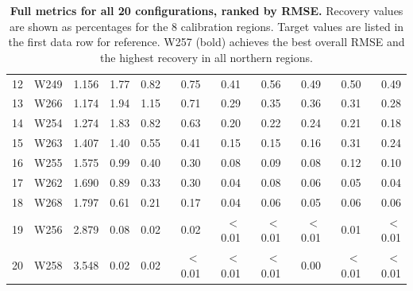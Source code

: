 \documentclass[11pt,a4paper,oneside]{article}
\begin{document}
\begin{table}[H]
\begin{tabular}{ll r rrrrrrrr}
12 & W249 & 1.156 & 1.77 & 0.82 & 0.75 & 0.41 & 0.56 & 0.49 & 0.50 & 0.49 \\
13 & W266 & 1.174 & 1.94 & 1.15 & 0.71 & 0.29 & 0.35 & 0.36 & 0.31 & 0.28 \\
14 & W254 & 1.274 & 1.83 & 0.82 & 0.63 & 0.20 & 0.22 & 0.24 & 0.21 & 0.18 \\
15 & W263 & 1.407 & 1.40 & 0.55 & 0.41 & 0.15 & 0.15 & 0.16 & 0.31 & 0.24 \\
16 & W255 & 1.575 & 0.99 & 0.40 & 0.30 & 0.08 & 0.09 & 0.08 & 0.12 & 0.10 \\
17 & W262 & 1.690 & 0.89 & 0.33 & 0.30 & 0.04 & 0.08 & 0.06 & 0.05 & 0.04 \\
18 & W268 & 1.797 & 0.61 & 0.21 & 0.17 & 0.04 & 0.06 & 0.05 & 0.06 & 0.06 \\
19 & W256 & 2.879 & 0.08 & 0.02 & 0.02 & $<$0.01 & $<$0.01 & $<$0.01 & 0.01 & $<$0.01 \\
20 & W258 & 3.548 & 0.02 & 0.02 & $<$0.01 & $<$0.01 & $<$0.01 & 0.00 & $<$0.01 & $<$0.01 \\
\bottomrule
\end{tabular}
\caption{\textbf{Full metrics for all 20 configurations, ranked by RMSE.} Recovery values are shown as percentages for the 8 calibration regions. Target values are listed in the first data row for reference. W257 (bold) achieves the best overall RMSE and the highest recovery in all northern regions.}
\label{tab:full_metrics}
\end{table}
\end{document}
